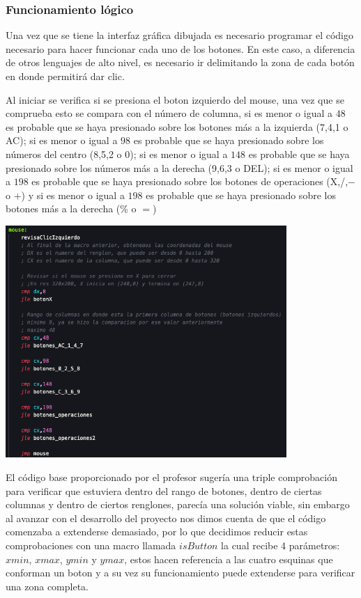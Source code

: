 \documentclass[letterpaper,12 pt,titlepage]{article}
\begin{document}
    \subsubsection{Funcionamiento lógico}

    Una vez que se tiene la interfaz gráfica dibujada es necesario programar el código necesario para hacer funcionar cada uno de los botones. En este caso, a diferencia de otros lenguajes de alto nivel, es necesario ir delimitando la zona de cada botón en donde permitirá dar clic.

    Al iniciar se verifica si se presiona el boton izquierdo del mouse, una vez que se comprueba esto se compara con el número de columna, si es menor o igual a $48$ es probable que se haya presionado sobre los botones más a la izquierda (7,4,1 o AC); si es menor o igual a $98$ es probable que se haya presionado sobre los números del centro (8,5,2 o 0); si es menor o igual a $148$ es probable que se haya presionado sobre los números más a la derecha (9,6,3 o DEL); si es menor o igual a $198$ es probable que se haya presionado sobre los botones de operaciones (X,/,$-$ o $+$) y si es menor o igual a $198$ es probable que se haya presionado sobre los botones más a la derecha (\% o $=$)

    \begin{center}
        \includegraphics[width=0.8\textwidth]{img/18.png}
    \end{center}


    El código base proporcionado por el profesor sugería una triple comprobación para verificar que estuviera dentro del rango de botones, dentro de ciertas columnas y dentro de ciertos renglones, parecía una solución viable, sin embargo al avanzar con el desarrollo del proyecto nos dimos cuenta de que el código comenzaba a extenderse demasiado, por lo que decidimos reducir estas comprobaciones con una macro llamada $isButton$ la cual recibe 4 parámetros:
    $xmin$, $xmax$, $ymin$ y $ymax$, estos hacen referencia a las cuatro esquinas que conforman un boton y a su vez su funcionamiento puede extenderse para verificar una zona completa.
\end{document}
